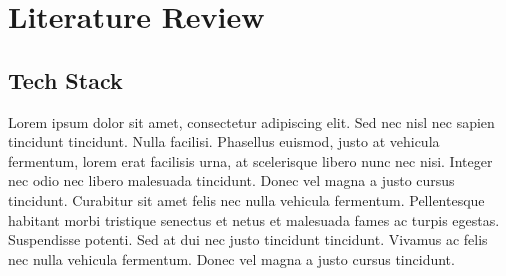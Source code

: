 \chapter{Literature Review}
\label{chap:lit_review}

\section{Tech Stack}

Lorem ipsum dolor sit amet, consectetur adipiscing elit. Sed nec nisl nec sapien tincidunt tincidunt. Nulla facilisi. Phasellus euismod, justo at vehicula fermentum, lorem erat facilisis urna, at scelerisque libero nunc nec nisi. Integer nec odio nec libero malesuada tincidunt. Donec vel magna a justo cursus tincidunt. Curabitur sit amet felis nec nulla vehicula fermentum. Pellentesque habitant morbi tristique senectus et netus et malesuada fames ac turpis egestas. Suspendisse potenti. Sed at dui nec justo tincidunt tincidunt. Vivamus ac felis nec nulla vehicula fermentum. Donec vel magna a justo cursus tincidunt.